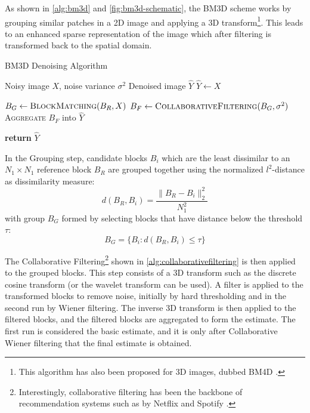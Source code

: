 As shown in \cref{alg:bm3d} and \cref{fig:bm3d-schematic}, the \gls{BM3D} scheme works by grouping similar patches in a 2D image and applying a 3D transform\footnote{This algorithm has also been proposed for 3D images, dubbed BM4D \cite{maggionimNonlocalTransformdomainFilter}.}. This leads to an enhanced sparse representation of the image which after filtering is transformed back to the spatial domain.
\begin{algorithm}
    \caption{BM3D Denoising Algorithm}\label{alg:bm3d}
    \begin{algorithmic}[1]
    \Require Noisy image $X$, noise variance $\sigma^2$
    \Ensure Denoised image $\hat{Y}$
    \Statex
        \State $\hat{Y} \gets X$
        
            \State $B_{G} \gets \textsc{BlockMatching}(B_R, X)$
            \State $B_{F} \gets \textsc{CollaborativeFiltering}(B_{G}, \sigma^2)$
            \State \textsc{Aggregate} $B_{F}$ into $\hat{Y}$
        \EndFor
        
        \State \textbf{return} $\hat{Y}$
    \EndProcedure
    \end{algorithmic}
\end{algorithm}

In the Grouping step, candidate blocks $B_i$ which are the least dissimilar to an $N_1 \times N_1$ reference block $B_R$ are grouped together using the normalized $l^2$-distance as dissimilarity measure:
$$d(B_R, B_i) = \frac{\|B_R - B_i\|_2^2}{N_1^2}$$
with group $B_G$ formed by selecting blocks that have distance below the threshold $\tau$:
$$B_G = \{ B_i : d(B_R, B_i) \leq \tau \}$$

The Collaborative Filtering\footnote{Interestingly, collaborative filtering has been the backbone of recommendation systems such as by Netflix and Spotify \cite{bellLessonsNetflixPrize2007,drorYahooMusicDataset2012}.} shown in \cref{alg:collaborativefiltering} is then applied to the grouped blocks. This step consists of a 3D transform such as the discrete cosine transform (or the wavelet transform can be used).
A filter is applied to the transformed blocks to remove noise, initially by hard thresholding and in the second run by Wiener filtering. The inverse 3D transform is then applied to the filtered blocks, and the filtered blocks are aggregated to form the estimate. The first run is considered the basic estimate, and it is only after Collaborative Wiener filtering that the final estimate is obtained.
    

